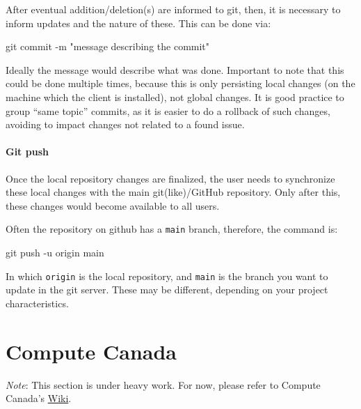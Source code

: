 \documentclass[
]{book}
\newenvironment{Shaded}{\begin{snugshade}}{\end{snugshade}}
\newcommand{\AttributeTok}[1]{\textcolor[rgb]{0.77,0.63,0.00}{#1}}
\newcommand{\FunctionTok}[1]{\textcolor[rgb]{0.00,0.00,0.00}{#1}}
\newcommand{\NormalTok}[1]{#1}
\newcommand{\StringTok}[1]{\textcolor[rgb]{0.31,0.60,0.02}{#1}}
\begin{document}
After eventual addition/deletion(s) are informed to git, then, it is necessary
to inform updates and the nature of these. This can be done via:

\begin{Shaded}
\begin{Highlighting}[]
\FunctionTok{git}\NormalTok{ commit }\AttributeTok{{-}m} \StringTok{"message describing the commit"}
\end{Highlighting}
\end{Shaded}

Ideally the message would describe what was done. Important to note that this
could be done multiple times, because this is only persisting local changes (on
the machine which the client is installed), not global changes. It is good practice
to group ``same topic'' commits, as it is easier to do a rollback of such changes,
avoiding to impact changes not related to a found issue.

\hypertarget{git-push}{%
\subsubsection{Git push}\label{git-push}}

Once the local repository changes are finalized, the user needs to synchronize
these local changes with the main git(like)/GitHub repository. Only after this,
these changes would become available to all users.

Often the repository on github has a \texttt{main} branch, therefore, the command is:

\begin{Shaded}
\begin{Highlighting}[]
\FunctionTok{git}\NormalTok{ push }\AttributeTok{{-}u}\NormalTok{ origin main}
\end{Highlighting}
\end{Shaded}

In which \texttt{origin} is the local repository, and \texttt{main} is the branch you want to
update in the git server. These may be different, depending on your project
characteristics.

\hypertarget{compute-canada}{%
\chapter{Compute Canada}\label{compute-canada}}

\emph{Note}: This section is under heavy work. For now, please refer to Compute
Canada's \href{https://docs.computecanada.ca/wiki/Compute_Canada_Documentation}{Wiki}.
\end{document}
